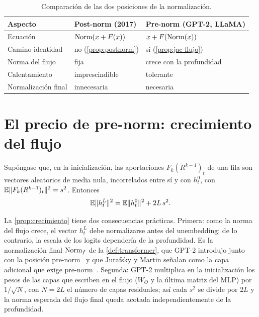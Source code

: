 \begin{table}[ht]
\centering\small
\caption{Comparación de las dos posiciones de la normalización.}\label{tab:prepost}
\begin{tabular}{@{}lll@{}}
\toprule
Aspecto & Post-norm (2017) & Pre-norm (GPT-2, LLaMA) \\
\midrule
Ecuación & $\operatorname{Norm}(x+F(x))$ & $x+F(\operatorname{Norm}(x))$ \\
Camino identidad & no (\cref{prop:postnorm}) & sí (\cref{prop:jac-flujo}) \\
Norma del flujo & fija & crece con la profundidad \\
Calentamiento & imprescindible & tolerante \\
Normalización final & innecesaria & necesaria \\
\bottomrule
\end{tabular}
\end{table}

\section{El precio de pre-norm: crecimiento del flujo}

\begin{proposicion}\label{prop:crecimiento}
Supóngase que, en la inicialización, las aportaciones $F_k(R^{k-1})_t$ de una fila son vectores aleatorios de media nula, incorrelados entre sí y con $h^{0}_t$, con $\mathbb{E}\lVert F_k(R^{k-1})_t\rVert^{2}=s^{2}$. Entonces
\[
\mathbb{E}\lVert h^{L}_t\rVert^{2}=\mathbb{E}\lVert h^{0}_t\rVert^{2}+2L\,s^{2}.
\]
\end{proposicion}

La \cref{prop:crecimiento} tiene dos consecuencias prácticas. Primera: como la norma del flujo crece, el vector $h^{L}_t$ debe normalizarse antes del unembedding; de lo contrario, la escala de los logits dependería de la profundidad. Es la normalización final $\operatorname{Norm}_f$ de la \cref{def:transformer}, que GPT-2 introdujo junto con la posición pre-norm~\cite[§2.3]{gpt2} y que Jurafsky y Martin señalan como la capa adicional que exige pre-norm~\cite[§7.2.3]{jm3}. Segunda: GPT-2 multiplica en la inicialización los pesos de las capas que escriben en el flujo ($W_O$ y la última matriz del MLP) por $1/\sqrt{N}$, con $N=2L$ el número de capas residuales; así cada $s^{2}$ se divide por $2L$ y la norma esperada del flujo final queda acotada independientemente de la profundidad.

\addtocounter{definicion}{1}%

\addtocounter{definicion}{1}%

